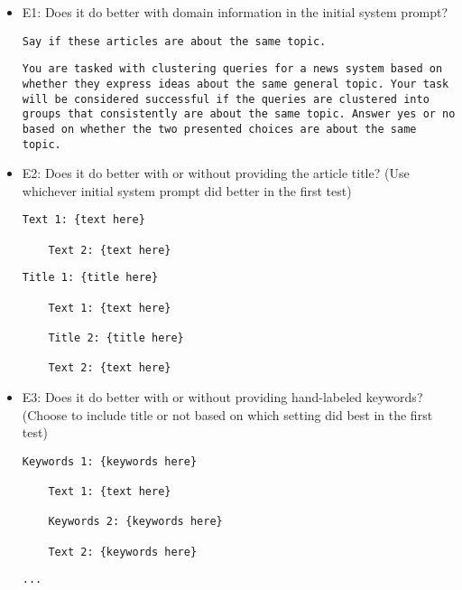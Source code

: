 \begin{itemize}
    \item E1: Does it do better with domain information in the initial system prompt?
    \begin{lstlisting}[title=Prompt 1: Generic Initial System Prompt]
    Say if these articles are about the same topic.
    \end{lstlisting}
    
    \begin{lstlisting}[title=Prompt 2: Detailed Initial System Prompt]
    You are tasked with clustering queries for a news system based on whether they express ideas about the same general topic. Your task will be considered successful if the queries are clustered into groups that consistently are about the same topic. Answer yes or no based on whether the two presented choices are about the same topic.
    \end{lstlisting}

    
    \item E2: Does it do better with or without providing the article title? (Use whichever initial system prompt did better in the first test)
    \begin{lstlisting}[title=Prompt 3: Text Alone Prompt]
    Text 1: {text here}
    
    Text 2: {text here}
    \end{lstlisting}
    \begin{lstlisting}[title=Prompt 4: Title and Text Prompt]
    Title 1: {title here}

    Text 1: {text here}

    Title 2: {title here}

    Text 2: {text here}
    \end{lstlisting}
    
    \item E3: Does it do better with or without providing hand-labeled keywords? (Choose to include title or not based on which setting did best in the first test)
    \begin{lstlisting}[title=Prompt 5: Keywords Prompt]
    Keywords 1: {keywords here}

    Text 1: {text here}

    Keywords 2: {keywords here}

    Text 2: {keywords here}
    \end{lstlisting}
    \begin{lstlisting}[title=Prompt 6: No Keywords Prompt]
    ...
    \end{lstlisting}
\end{itemize}


